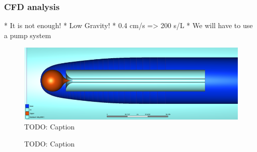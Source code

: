 \subsubsection{CFD analysis}

* It is not enough!
	* Low Gravity!
	* 0.4 cm/s => 200 s/L
	* We will have to use a pump system

\begin{figure}[htb]
	\centering
	\includegraphics[width=\textwidth]{figures/convection/simplified_3d_model.png}
	\caption{TODO: Caption}
	\label{fig:simplified_3d_model}
\end{figure}

\begin{figure}[htb]
	\centering
	\caption{TODO: Caption}
	\label{fig:cfd}
\end{figure}
